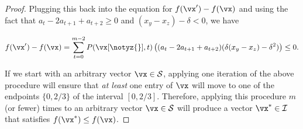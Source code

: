 \begin{proof}
	Plugging this back into the equation for $f(\vx') - f(\vx)$ and using the fact that $a_t - 2a_{t+1} + a_{t+2} \geq 0$ and $(x_y - x_z) - \delta < 0$, we have

	\[
		f(\vx') - f(\vx) = \sum_{t=0}^{m-2} P(\vx[\notyz{}],t) \left( (a_t - 2a_{t+1} + a_{t+2}) (\delta(x_y - x_z) - \delta^2)\right)\leq 0.
	\]

	If we start with an arbitrary vector $\vx \in \mathcal{S}$, applying one iteration of the above procedure will ensure that \emph{at least} one entry of $\vx$ will move to one of the endpoints $\{0,2/3\}$ of the interval $[0,2/3]$. Therefore, applying this procedure $m$ (or fewer) times to an arbitrary vector $\vx \in \mathcal{S}$ will produce a vector $\vx^* \in \mathcal{I}$ that satisfies $f(\vx^*) \leq f(\vx)$.
\end{proof}

